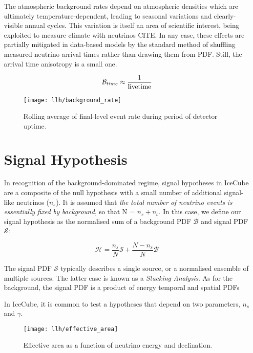 The atmospheric background rates depend on atmospheric densities which are ultimately temperature-dependent, leading to seasonal variations and clearly-visible annual cycles. This variation is itself an area of scientific interest, being exploited to measure climate with neutrinos CITE. In any case, these effects are partially mitigated in data-based models by the standard method of shuffling measured neutrino arrival times rather than drawing them from PDF. Still, the arrival time anisotropy is a small one.

\begin{equation}
\mathcal{B}_{time} \approx \frac{1}{\textup{livetime}}
\end{equation}

\begin{figure}[!ht]
	\centering \texttt{[image: llh/background\_rate]}
	\caption{Rolling average of final-level event rate during period of detector uptime.}
	\label{fig:background_rate}
\end{figure}

\section{Signal Hypothesis}

In recognition of the background-dominated regime, signal hypotheses in IceCube are a composite of the null hypothesis with a small number of additional signal-like neutrinos ($n_{s}$). It is assumed that \emph{the total number of neutrino events is essentially fixed by background}, so that N = $n_{s} + n_{b}$. In this case, we define our signal hypothesis as the normalised sum of a background PDF $\mathcal{B}$ and signal PDF $\mathcal{S}$:

\begin{equation}
\mathcal{H}= \frac{n_{s}}{N} \mathcal{S} + \frac{N - n_{s}}{N} \mathcal{B} 
\end{equation}

The signal PDF $\mathcal{S}$ typically describes a single source, or a normalised ensemble of multiple sources. The latter case is known as a \emph{Stacking Analysis}. As for the background, the signal PDF is a product of energy temporal and spatial PDFs

In IceCube, it is common to test a hypotheses that depend on two parameters, $n_{s}$ and $\gamma$. 

\begin{figure}[!ht]
	\centering \texttt{[image: llh/effective\_area]}
	\caption{Effective area as a function of neutrino energy and declination.}
	\label{fig:effective_area}
\end{figure}

